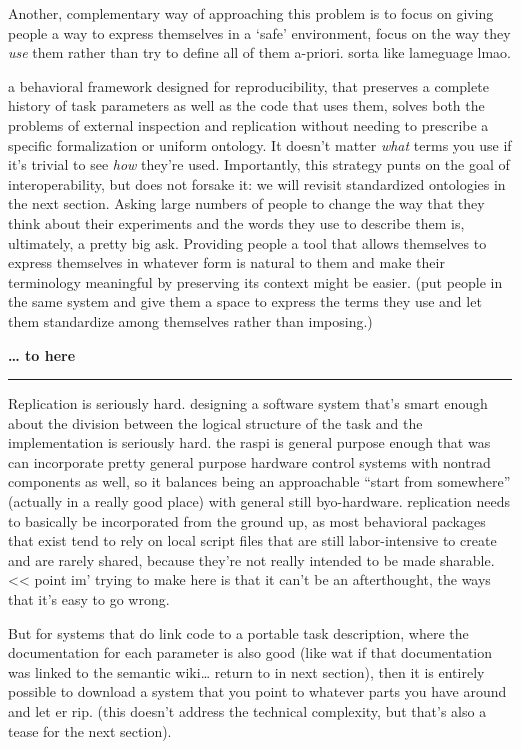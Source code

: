 \documentclass[10pt]{article}
\begin{document}
\begin{multicols}{2}
Another, complementary way of approaching this problem is to focus on
giving people a way to express themselves in a `safe' environment, focus
on the way they \emph{use} them rather than try to define all of them
a-priori. sorta like lameguage lmao.

a behavioral framework designed for reproducibility, that preserves a
complete history of task parameters as well as the code that uses them,
solves both the problems of external inspection and replication without
needing to prescribe a specific formalization or uniform ontology. It
doesn't matter \emph{what} terms you use if it's trivial to see
\emph{how} they're used. Importantly, this strategy punts on the goal of
interoperability, but does not forsake it: we will revisit standardized
ontologies in the next section. Asking large numbers of people to change
the way that they think about their experiments and the words they use
to describe them is, ultimately, a pretty big ask. Providing people a
tool that allows themselves to express themselves in whatever form is
natural to them and make their terminology meaningful by preserving its
context might be easier. (put people in the same system and give them a
space to express the terms they use and let them standardize among
themselves rather than imposing.)

\textbf{\ldots{} to here}

\begin{center}\rule{0.5\linewidth}{0.5pt}\end{center}

Replication is seriously hard. designing a software system that's smart
enough about the division between the logical structure of the task and
the implementation is seriously hard. the raspi is general purpose
enough that was can incorporate pretty general purpose hardware control
systems with nontrad components as well, so it balances being an
approachable ``start from somewhere'' (actually in a really good place)
with general still byo-hardware. replication needs to basically be
incorporated from the ground up, as most behavioral packages that exist
tend to rely on local script files that are still labor-intensive to
create and are rarely shared, because they're not really intended to be
made sharable. \textless\textless{} point im' trying to make here is
that it can't be an afterthought, the ways that it's easy to go wrong.

But for systems that do link code to a portable task description, where
the documentation for each parameter is also good (like wat if that
documentation was linked to the semantic wiki\ldots{} return to in next
section), then it is entirely possible to download a system that you
point to whatever parts you have around and let er rip. (this doesn't
address the technical complexity, but that's also a tease for the next
section).


\end{multicols}
\end{document}
